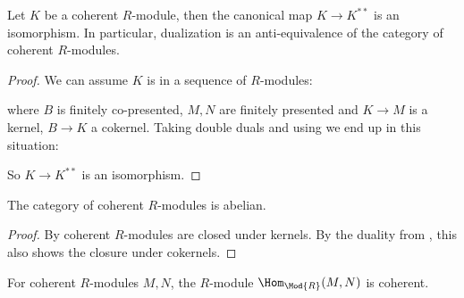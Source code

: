 \begin{theorem}
  \label{coherent-self-dual}
  Let $K$ be a coherent $R$-module, then the canonical map $K\to K^{\ast\ast}$ is an isomorphism.
  In particular, dualization is an anti-equivalence of the category of coherent $R$-modules.
\end{theorem}

\begin{proof}
  We can assume $K$ is in a sequence of $R$-modules:
  \begin{center}
  \end{center}
  where $B$ is finitely co-presented, $M,N$ are finitely presented and $K\to M$ is a kernel, $B\to K$ a cokernel.
  Taking double duals and using  we end up in this situation:
  \begin{center}
  \end{center}
  So $K\to K^{\ast\ast}$ is an isomorphism.
\end{proof}

\begin{theorem}
  \label{coherent-R-modules-abelian}
   The category of coherent $R$-modules is abelian.
\end{theorem}

\begin{proof}
  By  coherent $R$-modules are closed under kernels.
  By the duality from , this also shows the closure under cokernels.
\end{proof}

\begin{remark}
  \label{hom-closure}
  For coherent $R$-modules $M,N$, the $R$-module $\Hom_{\Mod{R}}(M,N)$ is coherent.
\end{remark}

